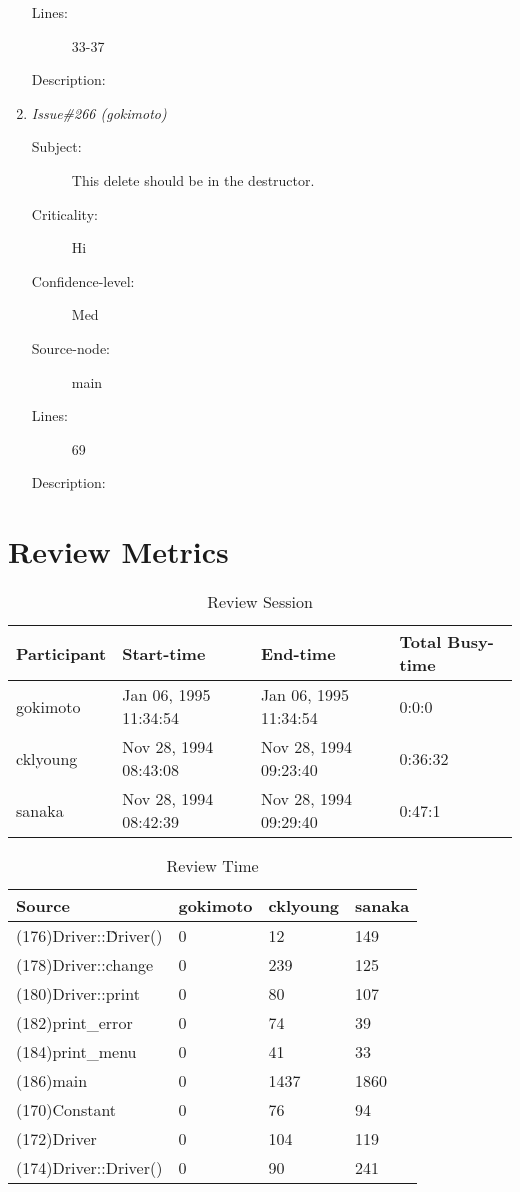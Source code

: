 \begin{enumerate}
\begin{description}
\item [Lines:] 33-37

\item [Description:] 
\end{description}
\item {\it Issue\#266 (gokimoto)}
\begin{description}
\item [Subject:] This delete should be in the destructor.
\item [Criticality:] Hi
\item [Confidence-level:] Med
\item [Source-node:] main

\item [Lines:] 69

\item [Description:] 
\end{description}
\end{enumerate}
\section{Review Metrics}
\begin{table}[hb]
\begin{center}
\begin{tabular}{|l|l|l|l|}
\hline
Participant & Start-time & End-time & Total Busy-time \\
\hline
gokimoto & Jan 06, 1995 11:34:54 & Jan 06, 1995 11:34:54 & 0:0:0 \\
cklyoung & Nov 28, 1994 08:43:08 & Nov 28, 1994 09:23:40 & 0:36:32 \\
sanaka & Nov 28, 1994 08:42:39 & Nov 28, 1994 09:29:40 & 0:47:1 \\
\hline
\end{tabular}
\end{center}
\caption{Review Session}
\end{table}


\begin{table}[hb]
\begin{center}
\begin{tabular}{|l|l|l|l|}
\hline
Source & gokimoto & cklyoung & sanaka\\
\hline
(176)Driver::\~Driver() & 0 & 12 & 149\\
(178)Driver::change & 0 & 239 & 125\\
(180)Driver::print & 0 & 80 & 107\\
(182)print\_error & 0 & 74 & 39\\
(184)print\_menu & 0 & 41 & 33\\
(186)main & 0 & 1437 & 1860\\
(170)Constant & 0 & 76 & 94\\
(172)Driver & 0 & 104 & 119\\
(174)Driver::Driver() & 0 & 90 & 241\\
\hline
\end{tabular}
\end{center}
\caption{Review Time}
\end{table}


